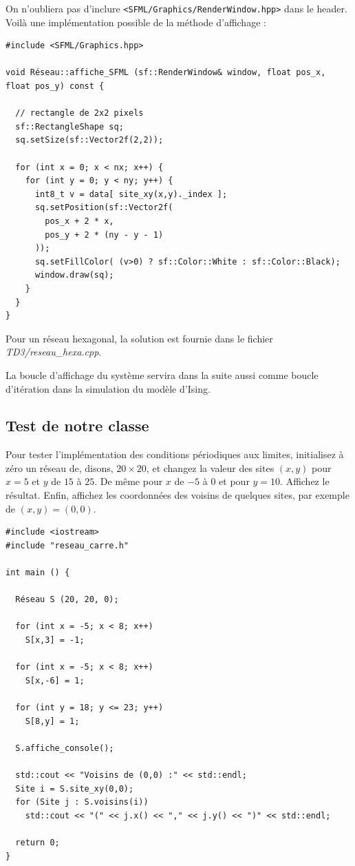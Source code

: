 \documentclass{book}
\newcommand{\inline}[1]{\texttt{#1}}
\def\filename{\emph}
\begin{document}
\begin{correction}
On n'oubliera pas d'inclure \inline{<SFML/Graphics/RenderWindow.hpp>} dans le header. Voilà une implémentation possible de la méthode d'affichage :
\begin{verbatim}
#include <SFML/Graphics.hpp>

void Réseau::affiche_SFML (sf::RenderWindow& window, float pos_x, float pos_y) const {

  // rectangle de 2x2 pixels
  sf::RectangleShape sq;
  sq.setSize(sf::Vector2f(2,2));

  for (int x = 0; x < nx; x++) {
    for (int y = 0; y < ny; y++) {
      int8_t v = data[ site_xy(x,y)._index ];
      sq.setPosition(sf::Vector2f(
        pos_x + 2 * x,
        pos_y + 2 * (ny - y - 1)
      ));
      sq.setFillColor( (v>0) ? sf::Color::White : sf::Color::Black);
      window.draw(sq);
    }
  }
}
\end{verbatim}

Pour un réseau hexagonal, la solution est fournie dans le fichier \filename{TD3/reseau\_hexa.cpp}.
\end{correction}

La boucle d'affichage du système servira dans la suite aussi comme boucle d'itération dans la simulation du modèle d'Ising.

\subsection{Test de notre classe}

Pour tester l'implémentation des conditions périodiques aux limites, initialisez à zéro un réseau de, disons, $20\times 20$, et changez la valeur des sites $(x,y)$ pour $x=5$ et $y$ de $15$ à $25$. De même pour $x$ de $-5$ à $0$ et pour $y=10$. Affichez le résultat. Enfin, affichez les coordonnées des voisins de quelques sites, par exemple de $(x,y)=(0,0)$.

\begin{correction}
\begin{verbatim}
#include <iostream>
#include "reseau_carre.h"

int main () {

  Réseau S (20, 20, 0);

  for (int x = -5; x < 8; x++) 
    S[x,3] = -1;

  for (int x = -5; x < 8; x++) 
    S[x,-6] = 1;
  
  for (int y = 18; y <= 23; y++) 
    S[8,y] = 1;
  
  S.affiche_console();

  std::cout << "Voisins de (0,0) :" << std::endl;
  Site i = S.site_xy(0,0);
  for (Site j : S.voisins(i))
    std::cout << "(" << j.x() << "," << j.y() << ")" << std::endl;

  return 0;
}
\end{verbatim}
\end{correction}
\end{document}
